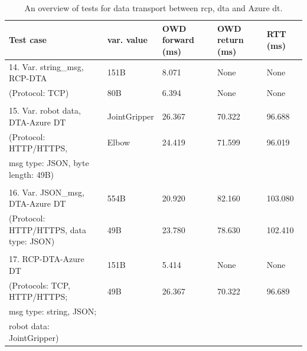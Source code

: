 \begin{table}[htbp]
    \footnotesize
\centering
\caption{An overview of tests for data transport between \gls{rcp}, \gls{dta} and Azure \gls{dt}.}
\label{tab: TestsDT}

\begin{tabular}{m{} m{} m{} m{} m{}}
\textbf{Test case}                               & \textbf{var. value}   & \textbf{OWD forward (ms)} & \textbf{OWD return (ms)} & \textbf{RTT (ms)} \\ \hline
14. Var. string\_msg, RCP-DTA           & 151B         & 8.071  & None   & None    \\
(Protocol: TCP)                         & 80B          & 6.394  & None   & None    \\
                                        &              &        &        &         \\
15. Var. robot data, DTA-Azure DT       & JointGripper & 26.367 & 70.322 & 96.688  \\
(Protocol: HTTP/HTTPS,                  & Elbow        & 24.419 & 71.599 & 96.019  \\
msg type: JSON, byte length: 49B)       &              &        &        &         \\
                                        &              &        &        &         \\
16. Var. JSON\_msg, DTA-Azure DT        & 554B         & 20.920 & 82.160 & 103.080 \\
(Protocol: HTTP/HTTPS, data type: JSON) & 49B          & 23.780 & 78.630 & 102.410 \\
                                        &              &        &        &         \\
17. RCP-DTA-Azure DT                    & 151B         & 5.414  & None   & None    \\
(Protocols: TCP, HTTP/HTTPS;            & 49B          & 26.367 & 70.322 & 96.689  \\
msg type: string, JSON;                 &              &        &        &         \\
robot data: JointGripper)               &              &        &        &    
\end{tabular}%

\end{table}



